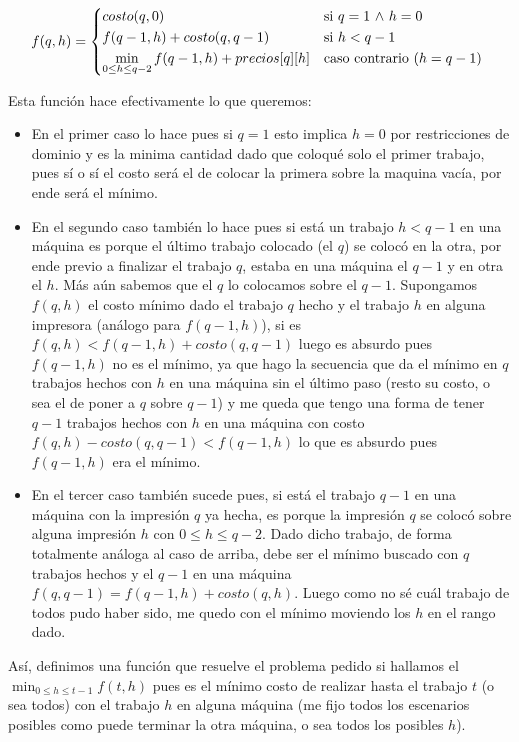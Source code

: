 \documentclass[A4paper,oneside,fleqn,11pt]{article}
\theoremstyle{definition}
\begin{document}
\begin{equation}
    f(q,h) =
    \begin{cases*}
       costo(q,0) & si  $q=1$  $\land$  $h=0 $\\
       f(q-1,h)+costo(q,q-1) & si  $h < q-1 $\\
       \displaystyle \min_{0 \leq h \leq q-2} {f(q-1,h)+precios[q][h]}       & caso contrario ($h=q-1$)
    \end{cases*}
  \end{equation}

Esta función hace efectivamente lo que queremos:
\begin{itemize}

 \item En el primer caso lo hace pues si $q=1$ esto implica $h=0$ por restricciones de dominio y es la minima cantidad dado que coloqué solo el primer trabajo, pues sí o sí el costo será el de colocar la primera sobre la maquina vacía, por ende será el mínimo.
 \item En el segundo caso también lo hace pues si está un trabajo $h<q-1$ en una máquina es porque el último trabajo colocado (el $q$) se colocó en la otra, por ende previo a finalizar el trabajo $q$, estaba en una máquina el $q-1$ y en otra el $h$. Más aún sabemos que el $q$ lo colocamos sobre el $q-1$. Supongamos $f(q,h)$ el costo mínimo dado el trabajo $q$ hecho y el trabajo $h$ en alguna impresora (análogo para $f(q-1,h)$), si es $f(q,h)<f(q-1,h)+costo(q,q-1)$ luego es absurdo pues $f(q-1,h)$ no es el mínimo, ya que hago la secuencia que da el mínimo en $q$ trabajos hechos con $h$ en una máquina sin el último paso (resto su costo, o sea el de poner a $q$ sobre $q-1$) y me queda que tengo una forma de tener $q-1$ trabajos hechos con $h$ en una máquina con costo $f(q,h)-costo(q,q-1)<f(q-1,h)$ lo que es absurdo pues $f(q-1,h)$ era el mínimo.
 \item En el tercer caso también sucede pues, si está el trabajo $q-1$ en una máquina con la impresión $q$ ya hecha, es porque la impresión $q$ se colocó sobre alguna impresión $h$ con $0 \leq h \leq q-2$. Dado dicho trabajo, de forma totalmente análoga al caso de arriba, debe ser el mínimo buscado con $q$ trabajos hechos y el $q-1$ en una máquina $f(q,q-1)= f(q-1,h)+costo(q,h)$. Luego como no sé cuál trabajo de todos pudo haber sido, me quedo con el mínimo moviendo los $h$ en el rango dado.
  \end{itemize}
Así, definimos una función que resuelve el problema pedido si hallamos el $\displaystyle \min_{0 \leq h \leq t-1} {f(t,h)}  $ pues es el mínimo costo de realizar hasta el trabajo $t$ (o sea todos) con el trabajo $h$ en alguna máquina (me fijo todos los escenarios posibles como puede terminar la otra máquina, o sea todos los posibles $h$). 
\end{document}
